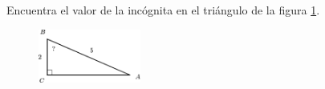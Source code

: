 Encuentra el valor de la incógnita en el triángulo de la figura \ref{fig:angle_functrig_11}.
\begin{figure}[H]
    \begin{center}
        \includegraphics[width=0.3\textwidth]{../images/angle_functrig_11.png}
    \end{center}
    \caption{}
    \label{fig:angle_functrig_11}
\end{figure}
